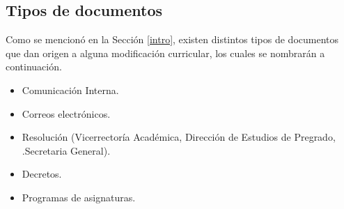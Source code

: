 	

\subsection{Tipos de documentos}



Como se mencionó en la Sección \ref{intro}, existen distintos  tipos de documentos que  dan origen a  alguna modificación curricular, los cuales se nombrarán a continuación.

\begin{itemize}
	\item Comunicación Interna.
	\item Correos electrónicos.
	\item  Resolución (Vicerrectoría Académica, Dirección de Estudios de Pregrado, .Secretaria General).
	\item Decretos.
	\item Programas de asignaturas.
\end{itemize}





